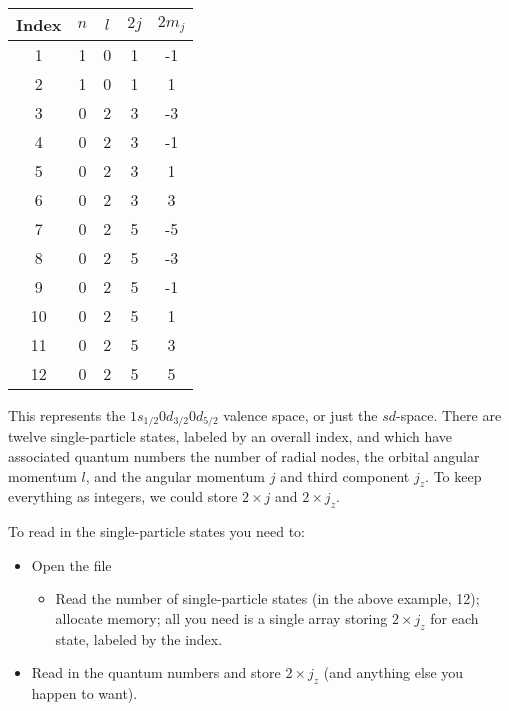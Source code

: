 \documentclass[graybox,sectrefs,envcountresetchap,open=right]{svmonodo}
\begin{document}
{\small   %

\vspace{4mm}

\begin{tabular}{ccccc}
\hline
\multicolumn{1}{c}{ Index } & \multicolumn{1}{c}{ $n$ } & \multicolumn{1}{c}{ $l$ } & \multicolumn{1}{c}{ $2j$ } & \multicolumn{1}{c}{ $2m_j$ } \\
\hline
1     & 1   & 0   & 1    & -1     \\
2     & 1   & 0   & 1    & 1      \\
3     & 0   & 2   & 3    & -3     \\
4     & 0   & 2   & 3    & -1     \\
5     & 0   & 2   & 3    & 1      \\
6     & 0   & 2   & 3    & 3      \\
7     & 0   & 2   & 5    & -5     \\
8     & 0   & 2   & 5    & -3     \\
9     & 0   & 2   & 5    & -1     \\
10    & 0   & 2   & 5    & 1      \\
11    & 0   & 2   & 5    & 3      \\
12    & 0   & 2   & 5    & 5      \\
\hline
\end{tabular}

\vspace{4mm}

}


\noindent
This represents the $1s_{1/2}0d_{3/2}0d_{5/2}$ valence space, or just the $sd$-space.  There are 
twelve single-particle states, labeled by an overall index, and which have associated quantum 
numbers the number of radial nodes, the orbital angular momentum $l$, and the 
angular momentum $j$ and third component $j_z$.  To keep everything as integers, we could store $2 \times j$ and 
$2 \times j_z$. 


To read in the single-particle states you need to:
\begin{itemize}
\item Open the file 
\begin{itemize}

 \item Read the number of single-particle states (in the above example, 12);  allocate memory; all you need is a single array storing $2\times j_z$ for each state, labeled by the index.

\end{itemize}

\noindent
\item Read in the quantum numbers and store $2 \times j_z$ (and anything else you happen to want).
\end{itemize}
\end{document}
